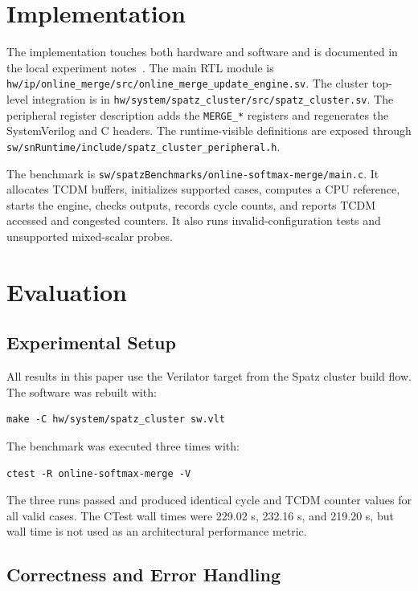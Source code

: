 \documentclass[conference]{IEEEtran}
\begin{document}
\section{Implementation}

The implementation touches both hardware and software and is documented in the
local experiment notes~\cite{spatz-local-docs}. The main RTL module is
\texttt{hw/ip/online\_merge/src/online\_merge\_update\_engine.sv}. The cluster
top-level integration is in \texttt{hw/system/spatz\_cluster/src/spatz\_cluster.sv}.
The peripheral register description adds the \texttt{MERGE\_*} registers and
regenerates the SystemVerilog and C headers. The runtime-visible definitions
are exposed through \texttt{sw/snRuntime/include/spatz\_cluster\_peripheral.h}.

The benchmark is \texttt{sw/spatzBenchmarks/online-softmax-merge/main.c}. It
allocates TCDM buffers, initializes supported cases, computes a CPU reference,
starts the engine, checks outputs, records cycle counts, and reports TCDM
accessed and congested counters. It also runs invalid-configuration tests and
unsupported mixed-scalar probes.

\section{Evaluation}

\subsection{Experimental Setup}

All results in this paper use the Verilator target from the Spatz cluster build
flow. The software was rebuilt with:

\begin{verbatim}
make -C hw/system/spatz_cluster sw.vlt
\end{verbatim}

The benchmark was executed three times with:

\begin{verbatim}
ctest -R online-softmax-merge -V
\end{verbatim}

The three runs passed and produced identical cycle and TCDM counter values for
all valid cases. The CTest wall times were 229.02 s, 232.16 s, and 219.20 s,
but wall time is not used as an architectural performance metric.

\subsection{Correctness and Error Handling}
\end{document}

